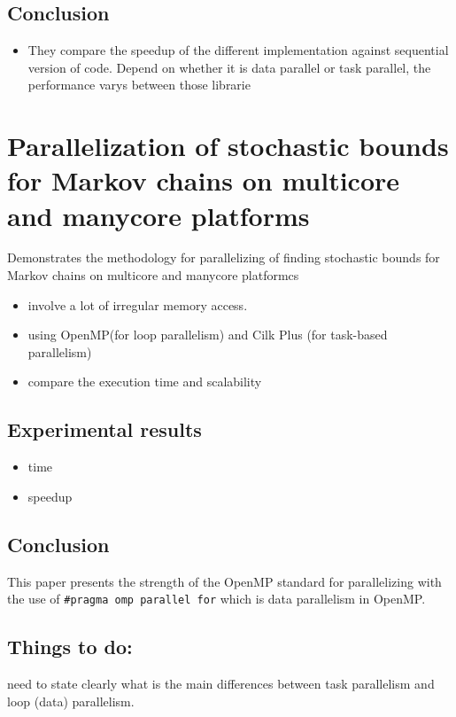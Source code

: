 \documentclass[11pt]{article}
\begin{document}
\subsection{Conclusion}
\label{sec-5-3}
\begin{itemize}
\item They compare the speedup of the different implementation against sequential version of code. Depend on whether it is data parallel or task parallel, the performance varys between those librarie
\end{itemize}
\section{Parallelization of stochastic bounds for Markov chains on multicore and manycore platforms \cite{bylina18_paral_stoch_bound_markov_chain}}
\label{sec-6}
Demonstrates the methodology for parallelizing of finding stochastic bounds for Markov chains on multicore and manycore platformcs
\begin{itemize}
\item involve a lot of irregular memory access.
\item using OpenMP(for loop parallelism) and Cilk Plus (for task-based parallelism)
\item compare the execution time and scalability
\end{itemize}

\subsection{Experimental results}
\label{sec-6-1}
\begin{itemize}
\item time
\item speedup
\end{itemize}
\subsection{Conclusion}
\label{sec-6-2}
This paper presents the strength of the OpenMP standard for parallelizing with the use of \verb~#pragma omp parallel for~ which is data parallelism in OpenMP.

\subsection{Things to do:}
\label{sec-6-3}
need to state clearly what is the main differences between task parallelism and loop (data) parallelism.
\end{document}
